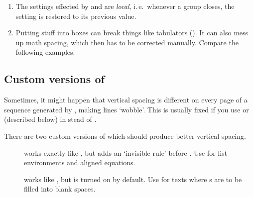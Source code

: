 \documentclass[12pt]{scrartcl}
\let\newslide=\relax
\begin{document}
  \newslide

  \begin{enumerate}
  \item The settings effected by  and  are \emph{local}, i.\,e.\ whenever
    a group closes, the setting is restored to its previous value.

  \item Putting stuff into boxes can break things like tabulators (\code{\&}). It can also mess up math spacing, which
    then has to be corrected manually. Compare the following examples:

  \end{enumerate}

  \newslide

  \subsection{Custom versions of }%
  Sometimes, it might happen that vertical spacing is different on every page of a sequence generated by
  , making lines `wobble'. This is usually fixed if you use  or
   (described below) in stead of .

  \newslide

  There are two custom versions of  which should produce better vertical spacing.
  \begin{description}
  \item[]
     works exactly like , but adds
    an `invisible rule' before . Use for list environments and
    aligned equations.
  \item[]
     works like , but
     is turned on by default. Use for texts where
    s are to be filled into blank spaces.
  \end{description}

  \newslide
\end{document}
